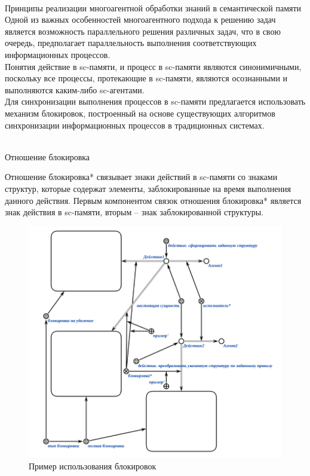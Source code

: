 \begin{frame}{\\Принципы реализации многоагентной обработки знаний в семантической памяти}
	Одной из важных особенностей многоагентного подхода к решению задач является возможность параллельного решения различных задач, что в свою очередь, предполагает параллельность выполнения соответствующих информационных процессов.\\
	Понятия действие в sc-памяти, и процесс в sc-памяти являются синонимичными, поскольку все процессы, протекающие в sc-памяти, являются осознанными и выполняются каким-либо sc-агентами.\\
	Для синхронизации выполнения процессов в sc-памяти предлагается использовать механизм блокировок, построенный на основе существующих алгоритмов синхронизации информационных процессов в традиционных системах.
\end{frame}

\begin{frame}{\\Отношение блокировка}

\begin{SCn}
\end{SCn}
Отношение блокировка* связывает знаки действий в sc-памяти со знаками структур, которые содержат элементы, заблокированные на время выполнения данного действия. Первым компонентом связок отношения блокировка* является знак действия в sc-памяти, вторым – знак заблокированной структуры.
\end{frame}
\begin{frame}
	\begin{figure}[H]
		\includegraphics[scale=0.30]{./figures/sd_multiagent_processing/blocking_example.png}
		\caption{Пример использования блокировок}
	\end{figure}
\end{frame}

